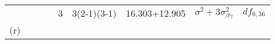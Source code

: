 \documentclass[12pt,]{article}
\begin{document}
\begin{longtable}[]{@{}lllllllll@{}}
\begin{minipage}[t]{0.06\columnwidth}
\end{minipage} & \begin{minipage}[t]{0.03\columnwidth}\raggedright
\strut
\end{minipage} & \begin{minipage}[t]{0.03\columnwidth}\raggedright
\strut
\end{minipage} & \begin{minipage}[t]{0.03\columnwidth}\raggedright
\strut
\end{minipage} & \begin{minipage}[t]{0.03\columnwidth}\raggedright
3\strut
\end{minipage} & \begin{minipage}[t]{0.12\columnwidth}\raggedright
3(2-1)(3-1)\strut
\end{minipage} & \begin{minipage}[t]{0.15\columnwidth}\raggedright
16.303+12.905\strut
\end{minipage} & \begin{minipage}[t]{0.21\columnwidth}\raggedright
\(\sigma^2+3\sigma^2_{\beta\gamma}\)\strut
\end{minipage} & \begin{minipage}[t]{0.09\columnwidth}\raggedright
\(df_{6,36}\)\strut
\end{minipage}\tabularnewline
\begin{minipage}[t]{0.06\columnwidth}\raggedright
(r)\strut
\end{minipage} & \begin{minipage}[t]{0.03\columnwidth}\raggedright
\strut
\end{minipage} & \begin{minipage}[t]{0.03\columnwidth}\raggedright
\strut
\end{minipage} & \begin{minipage}[t]{0.03\columnwidth}\raggedright
\strut
\end{minipage} & \begin{minipage}[t]{0.03\columnwidth}\raggedright
\strut
\end{minipage} & \begin{minipage}[t]{0.12\columnwidth}\raggedright
\strut
\end{minipage} & \begin{minipage}[t]{0.15\columnwidth}\raggedright
\strut
\end{minipage} & \begin{minipage}[t]{0.21\columnwidth}\raggedright
\strut
\end{minipage} & \begin{minipage}[t]{0.09\columnwidth}\raggedright

\end{minipage}
\end{longtable}
\end{document}
